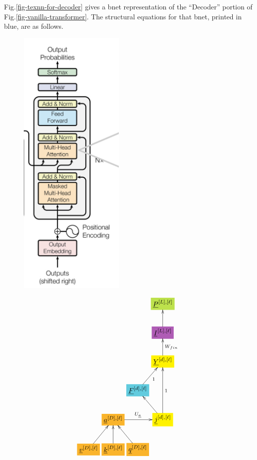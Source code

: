 Fig.\ref{fig-texnn-for-decoder}
gives a
bnet representation of
the \enquote{Decoder}
portion of Fig.\ref{fig-vanilla-transformer}.
The structural equations for that bnet,
printed in blue, are as follows.

\begin{figure}[h!]\centering
\begin{minipage}{.4\linewidth}
\includegraphics[width=2in]{transformer/decoder.jpg}
\end{minipage}%
\begin{minipage}{.6\linewidth}
$$\xymatrix@R=2pc@C=0.2pc{
&&&*+[F*:SpringGreen]{\underline{P}^{[L],[\ell]}}
\\
&&&*+[F*:Orchid]{\underline{I}^{[L],[\ell]}}\ar[u]
\\
&&&*+[F*:yellow]{\underline{Y}^{[d], [\ell]}}\ar[u]_{W_{fin}}
\\
&&*+[F*:SkyBlue]{\underline{F}^{[d], [\ell]}}\ar[ur]_{1}&
\\
&*+[F*:Dandelion]{\underline{a}^{[D],[\ell]}}\ar[rr]^{U_\rva}&&*+[F*:yellow]{\underline{j}^{[d], [\ell]}}\ar[ul]\ar[uu]_{1}
\\
*+[F*:Dandelion]{\underline{v}^{[D], [\ell]}}\ar[ur]&*+[F*:Dandelion]{\underline{k}^{[D], [\ell]}}\ar[u]&*+[F*:Dandelion]{\underline{q}^{[D], [\ell]}}\ar[ul]&
\\
}$$
\end{minipage}
\end{figure}
